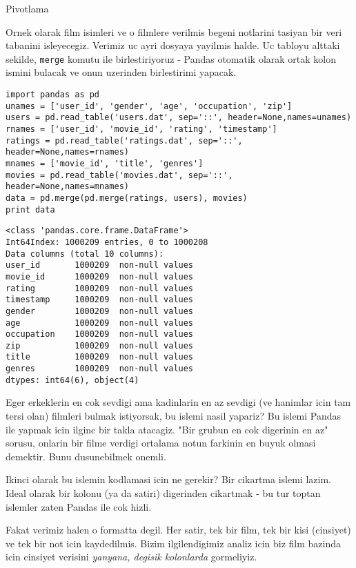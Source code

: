 \documentclass[12pt,fleqn]{article}\usepackage{../common}
\begin{document}
Pivotlama

Ornek olarak film isimleri ve o filmlere verilmis begeni notlarini
tasiyan bir veri tabanini isleyecegiz. Verimiz uc ayri dosyaya
yayilmis halde. Uc tabloyu alttaki sekilde, \verb!merge! komutu
ile birlestiriyoruz - Pandas otomatik olarak ortak kolon ismini
bulacak ve onun uzerinden birlestirimi yapacak.

\begin{verbatim}
import pandas as pd
unames = ['user_id', 'gender', 'age', 'occupation', 'zip']
users = pd.read_table('users.dat', sep='::', header=None,names=unames)
rnames = ['user_id', 'movie_id', 'rating', 'timestamp']
ratings = pd.read_table('ratings.dat', sep='::', header=None,names=rnames)
mnames = ['movie_id', 'title', 'genres']
movies = pd.read_table('movies.dat', sep='::', header=None,names=mnames)
data = pd.merge(pd.merge(ratings, users), movies)
print data
\end{verbatim}

\begin{verbatim}
<class 'pandas.core.frame.DataFrame'>
Int64Index: 1000209 entries, 0 to 1000208
Data columns (total 10 columns):
user_id       1000209  non-null values
movie_id      1000209  non-null values
rating        1000209  non-null values
timestamp     1000209  non-null values
gender        1000209  non-null values
age           1000209  non-null values
occupation    1000209  non-null values
zip           1000209  non-null values
title         1000209  non-null values
genres        1000209  non-null values
dtypes: int64(6), object(4)
\end{verbatim}

Eger erkeklerin en cok sevdigi ama kadinlarin en az sevdigi (ve
hanimlar icin tam tersi olan) filmleri bulmak istiyorsak, bu islemi
nasil yapariz? Bu islemi Pandas ile yapmak icin ilginc bir takla
atacagiz. "Bir grubun en cok digerinin en az" sorusu, onlarin bir
filme verdigi ortalama notun farkinin en buyuk olmasi demektir. Bunu
dusunebilmek onemli.

Ikinci olarak bu islemin kodlamasi icin ne gerekir? Bir cikartma
islemi lazim. Ideal olarak bir kolonu (ya da satiri) digerinden
cikartmak - bu tur toptan islemler zaten Pandas ile cok hizli.

Fakat verimiz halen o formatta degil.  Her satir, tek bir film, tek
bir kisi (cinsiyet) ve tek bir not icin kaydedilmis. Bizim
ilgilendigimiz analiz icin biz film bazinda icin cinsiyet verisini
{\em yanyana, degisik kolonlarda} gormeliyiz.
\end{document}
